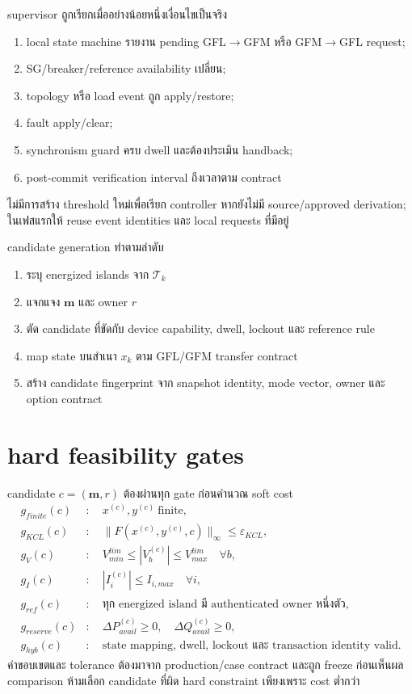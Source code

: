 \documentclass[12pt,a4paper]{article}
\begin{document}
supervisor ถูกเรียกเมื่ออย่างน้อยหนึ่งเงื่อนไขเป็นจริง
\begin{enumerate}
  \item local state machine รายงาน pending GFL$\rightarrow$GFM หรือ GFM$\rightarrow$GFL request;
  \item SG/breaker/reference availability เปลี่ยน;
  \item topology หรือ load event ถูก apply/restore;
  \item fault apply/clear;
  \item synchronism guard ครบ dwell และต้องประเมิน handback;
  \item post-commit verification interval ถึงเวลาตาม contract
\end{enumerate}
ไม่มีการสร้าง threshold ใหม่เพื่อเรียก controller หากยังไม่มี source/approved derivation; ในเฟสแรกให้ reuse
event identities และ local requests ที่มีอยู่

candidate generation ทำตามลำดับ
\begin{enumerate}
  \item ระบุ energized islands จาก $\mathcal T_k$
  \item แจกแจง $\mathbf m$ และ owner $r$
  \item ตัด candidate ที่ขัดกับ device capability, dwell, lockout และ reference rule
  \item map state บนสำเนา $x_k$ ตาม GFL/GFM transfer contract
  \item สร้าง candidate fingerprint จาก snapshot identity, mode vector, owner และ option contract
\end{enumerate}

\section{hard feasibility gates}

candidate $c=(\mathbf m,r)$ ต้องผ่านทุก gate ก่อนคำนวณ soft cost
\begin{align}
g_{finite}(c)&:\quad x^{(c)},y^{(c)}\ \text{finite},\\
g_{KCL}(c)&:\quad \|F(x^{(c)},y^{(c)},c)\|_\infty\le\varepsilon_{KCL},\\
g_V(c)&:\quad V_{min}^{lim}\le |V_b^{(c)}|\le V_{max}^{lim}\quad\forall b,\\
g_I(c)&:\quad |I_i^{(c)}|\le I_{i,max}\quad\forall i,\\
g_{ref}(c)&:\quad \text{ทุก energized island มี authenticated owner หนึ่งตัว},\\
g_{reserve}(c)&:\quad \Delta P_{avail}^{(c)}\ge0,\quad\Delta Q_{avail}^{(c)}\ge0,\\
g_{hyb}(c)&:\quad \text{state mapping, dwell, lockout และ transaction identity valid}.
\end{align}
ค่าขอบเขตและ tolerance ต้องมาจาก production/case contract และถูก freeze ก่อนเห็นผล comparison
ห้ามเลือก candidate ที่ผิด hard constraint เพียงเพราะ cost ต่ำกว่า
\end{document}
